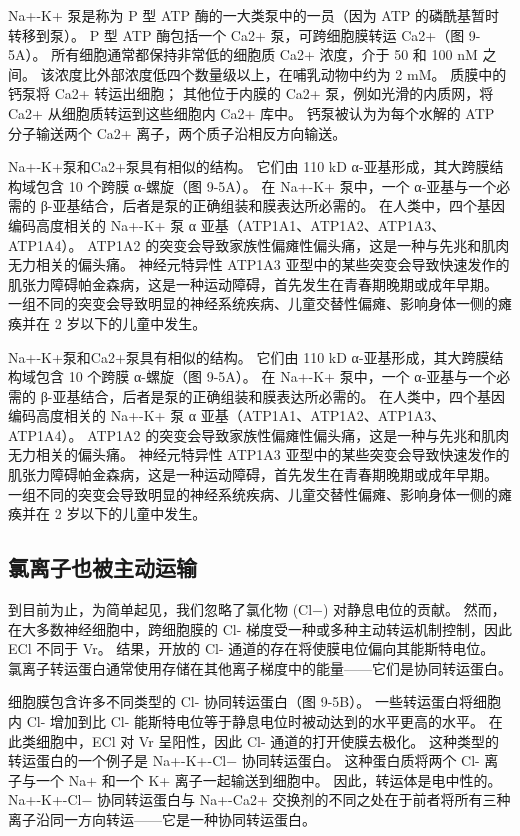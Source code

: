 Na+-K+ 泵是称为 P 型 ATP 酶的一大类泵中的一员（因为 ATP 的磷酰基暂时转移到泵）。 P 型 ATP 酶包括一个 Ca2+ 泵，可跨细胞膜转运 Ca2+（图 9-5A）。 所有细胞通常都保持非常低的细胞质 Ca2+ 浓度，介于 50 和 100 nM 之间。 该浓度比外部浓度低四个数量级以上，在哺乳动物中约为 2 mM。 质膜中的钙泵将 Ca2+ 转运出细胞； 其他位于内膜的 Ca2+ 泵，例如光滑的内质网，将 Ca2+ 从细胞质转运到这些细胞内 Ca2+ 库中。 钙泵被认为为每个水解的 ATP 分子输送两个 Ca2+ 离子，两个质子沿相反方向输送。

Na+-K+泵和Ca2+泵具有相似的结构。 它们由 110 kD α-亚基形成，其大跨膜结构域包含 10 个跨膜 α-螺旋（图 9-5A）。 在 Na+-K+ 泵中，一个 α-亚基与一个必需的 β-亚基结合，后者是泵的正确组装和膜表达所必需的。 在人类中，四个基因编码高度相关的 Na+-K+ 泵 α 亚基（ATP1A1、ATP1A2、ATP1A3、ATP1A4）。 ATP1A2 的突变会导致家族性偏瘫性偏头痛，这是一种与先兆和肌肉无力相关的偏头痛。 神经元特异性 ATP1A3 亚型中的某些突变会导致快速发作的肌张力障碍帕金森病，这是一种运动障碍，首先发生在青春期晚期或成年早期。 一组不同的突变会导致明显的神经系统疾病、儿童交替性偏瘫、影响身体一侧的瘫痪并在 2 岁以下的儿童中发生。

Na+-K+泵和Ca2+泵具有相似的结构。 它们由 110 kD α-亚基形成，其大跨膜结构域包含 10 个跨膜 α-螺旋（图 9-5A）。 在 Na+-K+ 泵中，一个 α-亚基与一个必需的 β-亚基结合，后者是泵的正确组装和膜表达所必需的。 在人类中，四个基因编码高度相关的 Na+-K+ 泵 α 亚基（ATP1A1、ATP1A2、ATP1A3、ATP1A4）。 ATP1A2 的突变会导致家族性偏瘫性偏头痛，这是一种与先兆和肌肉无力相关的偏头痛。 神经元特异性 ATP1A3 亚型中的某些突变会导致快速发作的肌张力障碍帕金森病，这是一种运动障碍，首先发生在青春期晚期或成年早期。 一组不同的突变会导致明显的神经系统疾病、儿童交替性偏瘫、影响身体一侧的瘫痪并在 2 岁以下的儿童中发生。


\subsection{氯离子也被主动运输}
到目前为止，为简单起见，我们忽略了氯化物 (Cl−) 对静息电位的贡献。 然而，在大多数神经细胞中，跨细胞膜的 Cl- 梯度受一种或多种主动转运机制控制，因此 ECl 不同于 Vr。 结果，开放的 Cl- 通道的存在将使膜电位偏向其能斯特电位。 氯离子转运蛋白通常使用存储在其他离子梯度中的能量——它们是协同转运蛋白。

细胞膜包含许多不同类型的 Cl- 协同转运蛋白（图 9-5B）。 一些转运蛋白将细胞内 Cl- 增加到比 Cl- 能斯特电位等于静息电位时被动达到的水平更高的水平。 在此类细胞中，ECl 对 Vr 呈阳性，因此 Cl- 通道的打开使膜去极化。 这种类型的转运蛋白的一个例子是 Na+-K+-Cl− 协同转运蛋白。 这种蛋白质将两个 Cl- 离子与一个 Na+ 和一个 K+ 离子一起输送到细胞中。 因此，转运体是电中性的。 Na+-K+-Cl− 协同转运蛋白与 Na+-Ca2+ 交换剂的不同之处在于前者将所有三种离子沿同一方向转运——它是一种协同转运蛋白。

